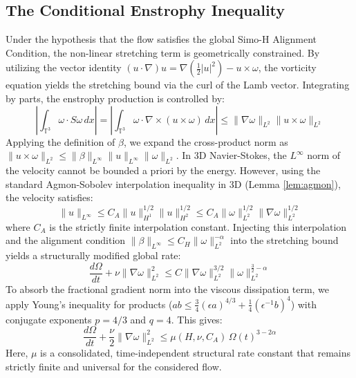 \documentclass[12pt,a4paper]{article}
\theoremstyle{plain}
\theoremstyle{definition}
\theoremstyle{remark}
\begin{document}
\subsection{The Conditional Enstrophy Inequality}
Under the hypothesis that the flow satisfies the global Simo-H Alignment Condition, the non-linear stretching term is geometrically constrained. By utilizing the vector identity $(u \cdot \nabla)u = \nabla(\frac{1}{2}|u|^2) - u \times \omega$, the vorticity equation yields the stretching bound via the curl of the Lamb vector. Integrating by parts, the enstrophy production is controlled by:
\begin{equation}
    \left| \int_{\mathbb{T}^3} \omega \cdot S \omega \, dx \right| = \left| \int_{\mathbb{T}^3} \omega \cdot \nabla \times (u \times \omega) \, dx \right| \leq \|\nabla \omega\|_{L^2} \|u \times \omega\|_{L^2}
\end{equation}
Applying the definition of $\beta$, we expand the cross-product norm as $\|u \times \omega\|_{L^2} \leq \|\beta\|_{L^\infty} \|u\|_{L^\infty} \|\omega\|_{L^2}$. 
In 3D Navier-Stokes, the $L^\infty$ norm of the velocity cannot be bounded a priori by the energy. However, using the standard Agmon-Sobolev interpolation inequality in 3D (Lemma \ref{lem:agmon}), the velocity satisfies:
\begin{equation}
    \|u\|_{L^\infty} \leq C_A \|u\|_{H^1}^{1/2} \|u\|_{H^2}^{1/2} \leq C_A \|\omega\|_{L^2}^{1/2} \|\nabla \omega\|_{L^2}^{1/2}
\end{equation}
where $C_A$ is the strictly finite interpolation constant. Injecting this interpolation and the alignment condition $\|\beta\|_{L^\infty} \leq C_H \|\omega\|_{L^2}^{-\alpha}$ into the stretching bound yields a structurally modified global rate:
\begin{equation}
    \frac{d\Omega}{dt} + \nu \|\nabla \omega\|_{L^2}^2 \leq C \|\nabla \omega\|_{L^2}^{3/2} \|\omega\|_{L^2}^{\frac{3}{2}-\alpha}
\end{equation}
To absorb the fractional gradient norm into the viscous dissipation term, we apply Young's inequality for products ($ab \leq \frac{3}{4}(\epsilon a)^{4/3} + \frac{1}{4}(\epsilon^{-1} b)^4$) with conjugate exponents $p=4/3$ and $q=4$. This gives:
\begin{equation}
    \frac{d\Omega}{dt} + \frac{\nu}{2} \|\nabla \omega\|_{L^2}^2 \leq \mu(H, \nu, C_A) \, \Omega(t)^{3-2\alpha}
\end{equation}
Here, $\mu$ is a consolidated, time-independent structural rate constant that remains strictly finite and universal for the considered flow.
\end{document}

